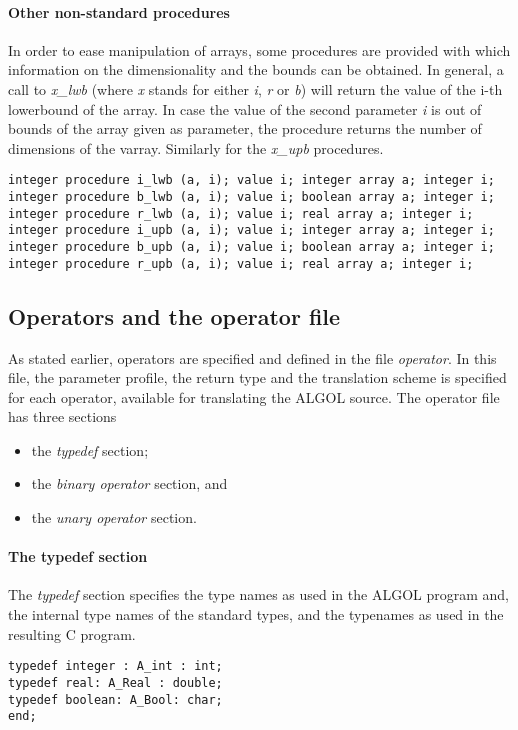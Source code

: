 \documentclass[11pt]{article}
\begin{document}
\paragraph{Other non-standard procedures}
In order to ease manipulation of arrays, some procedures are provided with which information on
the dimensionality and the bounds can be obtained.
In general, a call to {\em x\_lwb} (where {\em x} stands for
either {\em i}, {\em r} or {\em b})
will return the value of the i-th lowerbound of the array. 
In case the value of the second parameter {\em i}
is out of bounds of the array given as parameter,
the procedure returns the number of dimensions of the varray.
Similarly for the {\em x\_upb} procedures.
{\footnotesize
\begin{verbatim}
integer procedure i_lwb (a, i); value i; integer array a; integer i;
integer procedure b_lwb (a, i); value i; boolean array a; integer i; 
integer procedure r_lwb (a, i); value i; real array a; integer i; 
integer procedure i_upb (a, i); value i; integer array a; integer i; 
integer procedure b_upb (a, i); value i; boolean array a; integer i; 
integer procedure r_upb (a, i); value i; real array a; integer i; 
\end{verbatim}
}

\subsection{Operators and the operator file}
As stated earlier, operators are specified and defined
in the file {\em operator}.
In this file, the parameter profile, the return type and the
translation scheme is specified for each operator, available
for translating the ALGOL source.
The operator file has three sections
\begin{itemize}
\item the {\em typedef} section;
\item the {\em binary operator} section, and
\item the {\em unary operator} section.
\end{itemize}
\paragraph{The typedef section}
The {\em typedef} section specifies the type names as used in the ALGOL program and,
the internal type names of the standard types, and the
typenames as used in the resulting C program.

{\footnotesize
\begin{verbatim}
typedef integer : A_int : int;
typedef real: A_Real : double;
typedef boolean: A_Bool: char;
end;
\end{verbatim}
}
\end{document}

